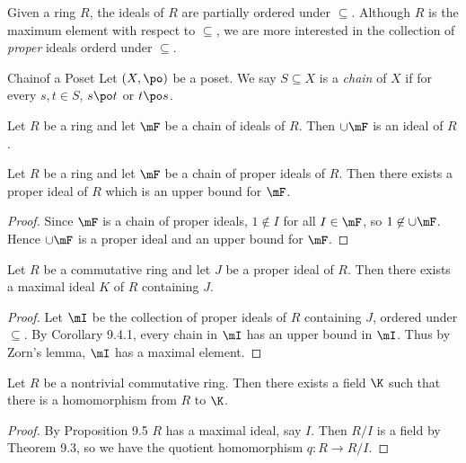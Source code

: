 \documentclass[pmath347]{subfiles}
\begin{document}
    \np Given a ring $R$, the ideals of $R$ are partially ordered under $\subseteq$. Although $R$ is the maximum element with respect to $\subseteq$, we are more interested in the collection of \textit{proper} ideals orderd under $\subseteq$.

    \begin{definition}{Chain}{of a Poset}
        Let $\left( X,\po \right)$ be a poset. We say $S\subseteq X$ is a \emph{chain} of $X$ if for every $s,t\in S$, $s\po t$ or $t\po s$.
    \end{definition}

    \begin{prop}{}
        Let $R$ be a ring and let $\mF$ be a chain of ideals of $R$. Then $\cup\mF$ is an ideal of $R$.
    \end{prop}

    \begin{cor}{}
        Let $R$ be a ring and let $\mF$ be a chain of proper ideals of $R$. Then there exists a proper ideal of $R$ which is an upper bound for $\mF$.
    \end{cor}	

    \begin{proof}
        Since $\mF$ is a chain of proper ideals, $1\notin I$ for all $I\in\mF$, so $1\not\in \cup\mF$. Hence $\cup\mF$ is a proper ideal and an upper bound for $\mF$.
    \end{proof}

    \clearpage
    \begin{prop}{}
        Let $R$ be a commutative ring and let $J$ be a proper ideal of $R$. Then there exists a maximal ideal $K$ of $R$ containing $J$.
    \end{prop}

    \begin{proof}
        Let $\mI$ be the collection of proper ideals of $R$ containing $J$, ordered under $\subseteq$. By Corollary 9.4.1, every chain in $\mI$ has an upper bound in $\mI$. Thus by Zorn's lemma, $\mI$ has a maximal element.
    \end{proof}

    \begin{cor}{}
        Let $R$ be a nontrivial commutative ring. Then there exists a field $\K$ such that there is a homomorphism from $R$ to $\K$.
    \end{cor}	

    \begin{proof}
        By Proposition 9.5 $R$ has a maximal ideal, say $I$. Then $R /I$ is a field by Theorem 9.3, so we have the quotient homomorphism $q:R\to R /I$.
    \end{proof}
\end{document}
